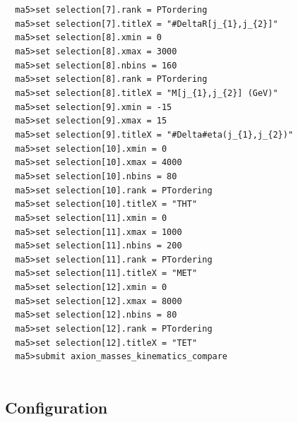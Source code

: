 \documentclass[a4paper, 10pt]{article}
\begin{document}
\texttt{ }\texttt{ }\texttt{ma5>set selection[7].rank = PTordering\\
}
\texttt{ }\texttt{ }\texttt{ma5>set selection[7].titleX = "\#DeltaR[j\_\{1\},j\_\{2\}]"\\
}
\texttt{ }\texttt{ }\texttt{ma5>set selection[8].xmin = 0\\
}
\texttt{ }\texttt{ }\texttt{ma5>set selection[8].xmax = 3000\\
}
\texttt{ }\texttt{ }\texttt{ma5>set selection[8].nbins = 160\\
}
\texttt{ }\texttt{ }\texttt{ma5>set selection[8].rank = PTordering\\
}
\texttt{ }\texttt{ }\texttt{ma5>set selection[8].titleX = "M[j\_\{1\},j\_\{2\}] (GeV)"\\
}
\texttt{ }\texttt{ }\texttt{ma5>set selection[9].xmin = -15\\
}
\texttt{ }\texttt{ }\texttt{ma5>set selection[9].xmax = 15\\
}
\texttt{ }\texttt{ }\texttt{ma5>set selection[9].titleX = "\#Delta\#eta(j\_\{1\},j\_\{2\})"\\
}
\texttt{ }\texttt{ }\texttt{ma5>set selection[10].xmin = 0\\
}
\texttt{ }\texttt{ }\texttt{ma5>set selection[10].xmax = 4000\\
}
\texttt{ }\texttt{ }\texttt{ma5>set selection[10].nbins = 80\\
}
\texttt{ }\texttt{ }\texttt{ma5>set selection[10].rank = PTordering\\
}
\texttt{ }\texttt{ }\texttt{ma5>set selection[10].titleX = "THT"\\
}
\texttt{ }\texttt{ }\texttt{ma5>set selection[11].xmin = 0\\
}
\texttt{ }\texttt{ }\texttt{ma5>set selection[11].xmax = 1000\\
}
\texttt{ }\texttt{ }\texttt{ma5>set selection[11].nbins = 200\\
}
\texttt{ }\texttt{ }\texttt{ma5>set selection[11].rank = PTordering\\
}
\texttt{ }\texttt{ }\texttt{ma5>set selection[11].titleX = "MET"\\
}
\texttt{ }\texttt{ }\texttt{ma5>set selection[12].xmin = 0\\
}
\texttt{ }\texttt{ }\texttt{ma5>set selection[12].xmax = 8000\\
}
\texttt{ }\texttt{ }\texttt{ma5>set selection[12].nbins = 80\\
}
\texttt{ }\texttt{ }\texttt{ma5>set selection[12].rank = PTordering\\
}
\texttt{ }\texttt{ }\texttt{ma5>set selection[12].titleX = "TET"\\
}
\texttt{ }\texttt{ }\texttt{ma5>submit axion\_masses\_kinematics\_compare\\
}
\texttt{ }\texttt{ }\subsection{ Configuration}
\end{document}
